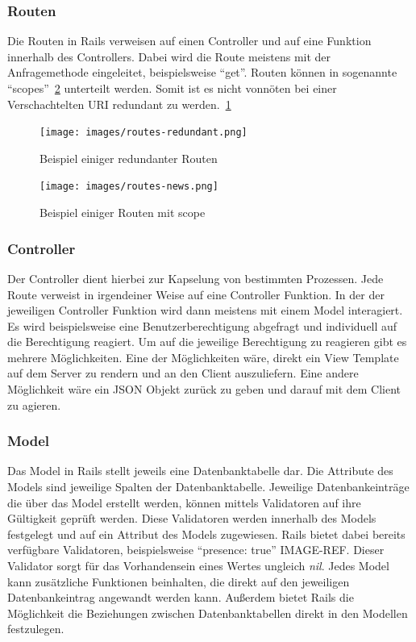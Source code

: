\documentclass[paper=a4,fontsize=12pt,parskip=half]{scrartcl}
\newcommand{\hlnote}[2]{#1}
\newcommand{\hlnote}[2]{\todo{#2}\texthl{#1}}
\begin{document}
	\subsubsection{Routen}
	\label{sec: routen}
	Die Routen in Rails verweisen auf einen Controller und auf eine Funktion innerhalb des Controllers. Dabei wird die Route meistens mit der Anfragemethode eingeleitet, beispielsweise \enquote{get}. Routen können in sogenannte \enquote{scopes}~\ref{fig:routes-scope} unterteilt werden. Somit ist es nicht vonnöten bei einer Verschachtelten \gls{URI} redundant zu werden.~\ref{fig:routes-redundant}

	\begin{figure}
		\texttt{[image: images/routes-redundant.png]}
		\caption{Beispiel einiger redundanter Routen }
		\label{fig:routes-redundant}
	\end{figure}

	\begin{figure}
		\texttt{[image: images/routes-news.png]}
		\caption{Beispiel einiger Routen mit scope }
		\label{fig:routes-scope}
	\end{figure}

	\subsubsection{Controller}
	\label{sec: rails_controller}
	Der Controller dient hierbei zur Kapselung von bestimmten Prozessen. Jede Route verweist in irgendeiner Weise auf eine Controller Funktion. In der der jeweiligen Controller Funktion wird dann meistens mit einem Model interagiert. Es wird beispielsweise eine Benutzerberechtigung abgefragt und individuell auf die Berechtigung reagiert. Um auf die jeweilige Berechtigung zu reagieren gibt es mehrere Möglichkeiten. Eine der Möglichkeiten wäre, direkt ein View Template auf dem Server zu rendern und an den Client auszuliefern. Eine andere Möglichkeit wäre ein \gls{JSON} Objekt zurück zu geben und darauf mit dem Client zu agieren.

	\subsubsection{Model}
	\label{sec: rails_model}
	Das Model in Rails stellt jeweils eine Datenbanktabelle dar. Die Attribute des Models sind jeweilige Spalten der Datenbanktabelle. Jeweilige Datenbankeinträge die über das Model erstellt werden, können mittels Validatoren auf ihre Gültigkeit geprüft werden. Diese Validatoren werden innerhalb des Models festgelegt und auf ein Attribut des Models zugewiesen. Rails bietet dabei bereits verfügbare Validatoren, beispielsweise \enquote{presence: true} \hlnote{IMAGE-REF}{Bild Referenz}. Dieser Validator sorgt für das Vorhandensein eines Wertes ungleich \textit{nil}. Jedes Model kann zusätzliche Funktionen beinhalten, die direkt auf den jeweiligen Datenbankeintrag angewandt werden kann. Außerdem bietet Rails die Möglichkeit die Beziehungen zwischen Datenbanktabellen direkt in den Modellen festzulegen.
\end{document}
